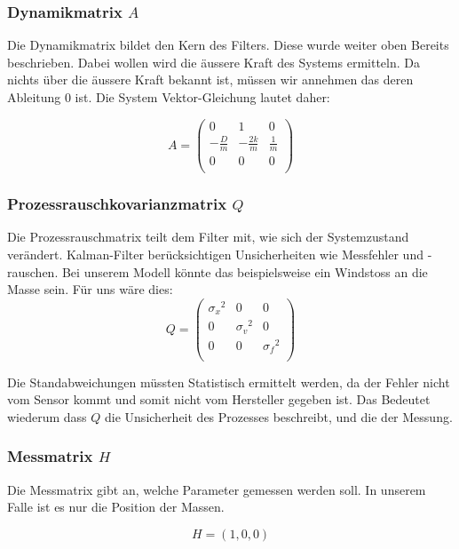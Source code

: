 \subsubsection*{Dynamikmatrix $A$}
Die Dynamikmatrix bildet den Kern des Filters. Diese wurde weiter oben Bereits beschrieben. Dabei wollen wird die äussere Kraft des Systems ermitteln.
Da nichts über die äussere Kraft bekannt ist, müssen wir annehmen das deren Ableitung 0 ist.
Die System Vektor-Gleichung lautet daher:


\begin{equation}
A = \left(
 \begin{array}{ccc} 	
0 & 1& 0 \\
- \frac{D}{m} &-\frac{2k}{m} & \frac{1} {m}\\
0 & 0& 0\\ 
\end{array}\right)  
\end{equation} 

\subsubsection*{Prozessrauschkovarianzmatrix $Q$}
Die Prozessrauschmatrix teilt dem Filter mit, wie sich der Systemzustand verändert. Kalman-Filter berücksichtigen Unsicherheiten wie Messfehler und -rauschen. Bei unserem Modell könnte das beispielsweise ein Windstoss an die Masse sein. Für uns wäre dies:
\begin{equation}
Q = \left(
 \begin{array}{ccc} 	
{\sigma_x }^2& 0& 0 \\ 
0 & {\sigma_v }^2& 0\\ 
0 & 0& {\sigma_f }^2\\
\end{array}\right)  
\end{equation} 

Die Standabweichungen müssten Statistisch ermittelt werden, da der Fehler nicht vom Sensor kommt und somit nicht vom Hersteller gegeben ist. Das Bedeutet wiederum dass $Q$ die Unsicherheit des Prozesses beschreibt, und die der Messung. 

\subsubsection*{Messmatrix $H$}
Die Messmatrix gibt an, welche Parameter gemessen werden soll. In unserem Falle ist es nur die Position der Massen. 

\[ H = (1, 0, 0) \]



